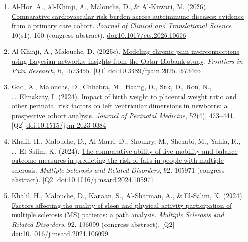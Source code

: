 \documentclass[10pt,a4paper]{article}
\newcommand{\doi}[1]{\href{https://doi.org/#1}{doi:#1}}
\newcommand{\Qu}[1]{[Q#1]}
\begin{document}
\begin{enumerate}
\item Al-Hor, A., Al-Khinji, A., Malouche, D., \& Al-Kuwari, M. (2026). \href{https://doi.org/10.1017/cts.2026.10636}{Comparative cardiovascular risk burden across autoimmune diseases: evidence from a primary care cohort}. \emph{Journal of Clinical and Translational Science}, 10(s1), 160 (congress abstract). \doi{10.1017/cts.2026.10636}
\item Al-Khinji, A., Malouche, D. (2025c). \href{https://doi.org/10.3389/fpain.2025.1573465}{Modeling chronic pain interconnections using Bayesian networks: insights from the Qatar Biobank study}. \emph{Frontiers in Pain Research}, 6, 1573465. \Qu1 \doi{10.3389/fpain.2025.1573465}
\item Gad, A., Malouche, D., Chhabra, M., Hoang, D., Suk, D., Ron, N., \ldots\ Elmakaty, I. (2024). \href{https://doi.org/10.1515/jpm-2023-0384}{Impact of birth weight to placental weight ratio and other perinatal risk factors on left ventricular dimensions in newborns: a prospective cohort analysis}. \emph{Journal of Perinatal Medicine}, 52(4), 433--444. \Qu2 \doi{10.1515/jpm-2023-0384}
\item Khalil, H., Malouche, D., Al Marri, D., Shoukry, M., Shehabi, M., Yahia, R., \ldots\ El-Salim, K. (2024). \href{https://doi.org/10.1016/j.msard.2024.105971}{The comparative ability of five mobility and balance outcome measures in predicting the risk of falls in people with multiple sclerosis}. \emph{Multiple Sclerosis and Related Disorders}, 92, 105971 (congress abstract). \Qu2 \doi{10.1016/j.msard.2024.105971}
\item Khalil, H., Malouche, D., Kanaan, S., Al-Sharman, A., \& El-Salim, K. (2024). \href{https://doi.org/10.1016/j.msard.2024.106099}{Factors affecting the quality of sleep and physical activity participation of multiple sclerosis (MS) patients: a path analysis}. \emph{Multiple Sclerosis and Related Disorders}, 92, 106099 (congress abstract). \Qu2 \doi{10.1016/j.msard.2024.106099}


\end{enumerate}
\end{document}

